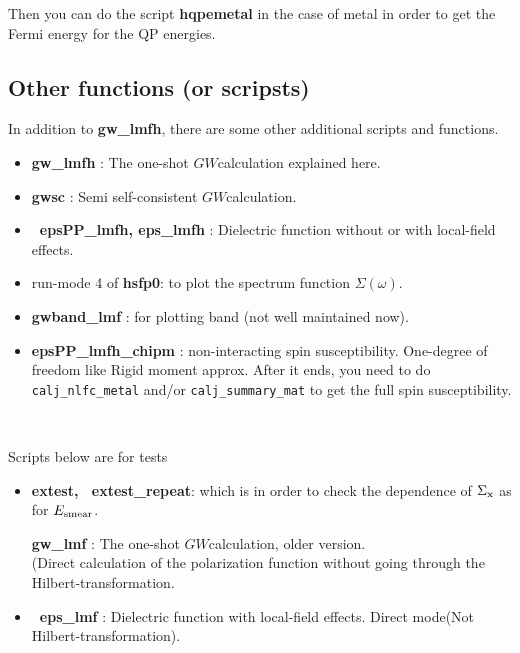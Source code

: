 \documentclass[a4paper,10pt,epsf,fleqn]{article}
\newcommand{\GW}{$GW$}
\begin{document}
{Then you can do the script {\bf hqpemetal} in the case of metal in order to get
the Fermi energy for the QP energies.


\vspace{3mm}
\subsection{\bf Other functions (or scripsts)}
In addition to {\bf gw\_lmfh}, there are some other additional scripts 
and functions.

\begin{itemize}
\item
{\bf gw\_lmfh} : The one-shot \GW calculation explained here. \\

\item
{\bf gwsc} : Semi self-consistent \GW calculation.

\item
{\bf \ epsPP\_lmfh, eps\_lmfh} : Dielectric function without or with local-field effects.

\item
 run-mode 4 of {\bf hsfp0}: to plot the spectrum function $\Sigma(\omega)$. 

\item
{\bf gwband\_lmf} : for plotting band (not well maintained now).

\item
{\bf epsPP\_lmfh\_chipm} : non-interacting spin susceptibility. 
One-degree of freedom like Rigid moment approx.
After it ends, you need to do \verb#calj_nlfc_metal# and/or \verb#calj_summary_mat#
to get the full spin susceptibility.

\end{itemize}

 \

Scripts below are for tests 
\begin{itemize}
\item
{\bf extest, \ extest\_repeat}: 
which is in order to check the dependence of $\Sigma_{\rm x}$ as for $E_{\rm smear}$.

{\bf gw\_lmf} : The one-shot \GW calculation, older version. \\
(Direct calculation of the polarization function
without going through the Hilbert-transformation.

\item
{\bf \ eps\_lmf}   : Dielectric function with local-field effects. 
Direct mode(Not Hilbert-transformation).


\end{itemize}}
\end{document}
